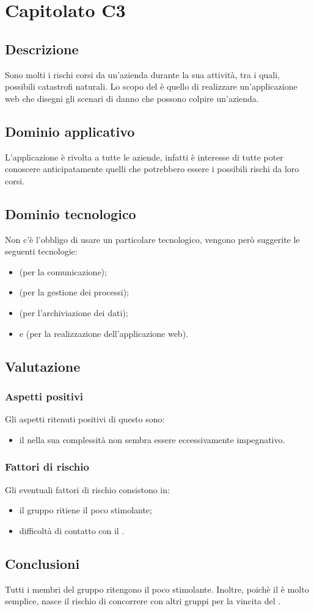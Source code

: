 \section {Capitolato C3}
	\subsection {Descrizione}
		Sono molti i rischi corsi da un'azienda durante la sua attività, tra i quali, possibili catastrofi naturali. Lo scopo del  è quello di realizzare un'applicazione web che disegni gli scenari di
		danno che possono colpire un'azienda.
	\subsection {Dominio applicativo}
		L'applicazione è rivolta a tutte le aziende, infatti è interesse di tutte poter conoscere anticipatamente quelli che potrebbero essere i possibili rischi da loro corsi.
	\subsection {Dominio tecnologico}
		Non c'è l'obbligo di usare un particolare  tecnologico, vengono però suggerite le seguenti tecnologie:
		\begin{itemize}
			\item \textbf{} (per la comunicazione);
			\item \textbf{} (per la gestione dei processi);
			\item \textbf{} (per l'archiviazione dei dati);
			\item \textbf{} e \textbf{} (per la realizzazione dell'applicazione web).
		\end{itemize}
	\subsection {Valutazione}
		\subsubsection {Aspetti positivi}
		Gli aspetti ritenuti positivi di questo  sono:
			\begin{itemize}
				\item il  nella sua complessità non sembra essere eccessivamente impegnativo.
			\end{itemize}
		\subsubsection {Fattori di rischio}
		Gli eventuali fattori di rischio consistono in:
			\begin{itemize}
				\item il gruppo ritiene il  poco stimolante;
				\item difficoltà di contatto con il .
			\end{itemize}
	\subsection {Conclusioni}
		Tutti i membri del gruppo ritengono il  poco stimolante. Inoltre, poichè il  è molto semplice, nasce il rischio di concorrere con altri gruppi per la vincita del .